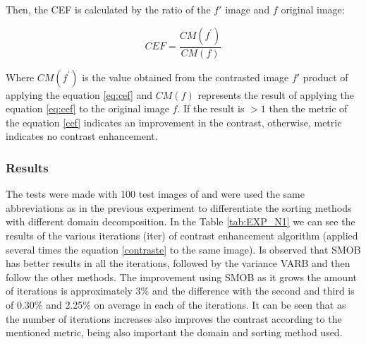 Then, the CEF is calculated by the ratio of the $f'$ image and $f$ original image:

\begin{equation}
CEF = \frac{CM(f^{'})}{CM(f)}
\label{cef}
\end{equation}

Where $CM(f^{'})$ is the value obtained from the contrasted image $f'$ product of applying the equation \ref{eq:cef} and $CM(f)$ represents the result of applying the equation \ref{eq:cef} to the original image $f$. If the result is $> 1$ then the metric of the equation \ref{cef} indicates an improvement in the contrast, otherwise, metric indicates no contrast enhancement.



\subsubsection{Results}
The tests were made with 100 test images of \cite{arbelaez2007berkeley} and were used the same abbreviations as in the previous experiment to differentiate the sorting methods with different domain decomposition. 
In the Table \ref{tab:EXP_N1} we can see the results of the various iterations (iter) of contrast enhancement algorithm (applied several times the equation \ref{contraste} to the same image).  
Is observed that SMOB has better results in all the iterations, followed by the variance VARB and then follow the other methods. The improvement using SMOB as it grows the amount  of iterations is approximately 3\% and the difference with the second and third is of 0.30\% and 2.25\% on average in each of the iterations.
It can be seen that as the number of iterations increases also improves the contrast according to the mentioned metric, being also important the domain and sorting method used.


